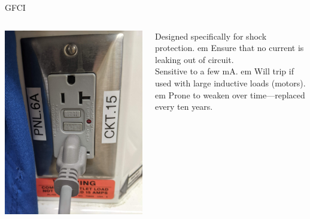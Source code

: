 \documentclass{presentation}
\begin{document}
\begin{frame}{GFCI}
  \begin{columns}
    \begin{column}{0.33\textwidth}
      \includegraphics[width=\textwidth]{"./PXL_20230117_221804507.jpg"}
    \end{column}
    \begin{column}{0.67\textwidth}
      Designed specifically for shock protection.
       em
      Ensure that no current is leaking out of circuit. \\
      Sensitive to a few mA.
       em
      Will trip if used with large inductive loads (motors).
       em
      Prone to weaken over time---replaced every ten years.
    \end{column}
  \end{columns}
\end{frame}
\end{document}
